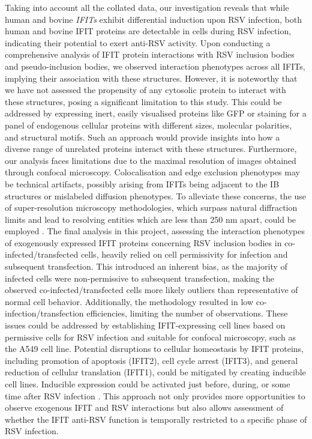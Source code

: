 Taking into account all the collated data, our investigation reveals that while human and bovine \textit{IFITs} exhibit differential induction upon RSV infection, both human and bovine IFIT proteins are detectable in cells during RSV infection, indicating their potential to exert anti-RSV activity. Upon conducting a comprehensive analysis of IFIT protein interactions with RSV inclusion bodies and pseudo-inclusion bodies, we observed interaction phenotypes across all IFITs, implying their association with these structures. However, it is noteworthy that we have not assessed the propensity of any cytosolic protein to interact with these structures, posing a significant limitation to this study. This could be addressed by expressing inert, easily visualised proteins like GFP or staining for a panel of endogenous cellular proteins with different sizes, molecular polarities, and structural motifs. Such an approach would provide insights into how a diverse range of unrelated proteins interact with these structures. Furthermore, our analysis faces limitations due to the maximal resolution of images obtained through confocal microscopy. Colocalisation and edge exclusion phenotypes may be technical artifacts, possibly arising from IFITs being adjacent to the IB structures or mislabeled diffusion phenotypes. To alleviate these concerns, the use of super-resolution microscopy methodologies, which surpass natural diffraction limits and lead to resolving entities which are less than 250 nm apart, could be employed \cite{Schermelleh2019Super-resolutionDemystified}. The final analysis in this project, assessing the interaction phenotypes of exogenously expressed IFIT proteins concerning RSV inclusion bodies in co-infected/transfected cells, heavily relied on cell permissivity for infection and subsequent transfection. This introduced an inherent bias, as the majority of infected cells were non-permissive to subsequent transfection, making the observed co-infected/transfected cells more likely outliers than representative of normal cell behavior. Additionally, the methodology resulted in low co-infection/transfection efficiencies, limiting the number of observations. These issues could be addressed by establishing IFIT-expressing cell lines based on permissive cells for RSV infection and suitable for confocal microscopy, such as the A549 cell line. Potential disruptions to cellular homeostasis by IFIT proteins, including promotion of apoptosis (IFIT2), cell cycle arrest (IFIT3), and general reduction of cellular translation (IFIT1), could be mitigated by creating inducible cell lines. Inducible expression could be activated just before, during, or some time after RSV infection \cite{Kallunki2019HowStudies}. This approach not only provides more opportunities to observe exogenous IFIT and RSV interactions but also allows assessment of whether the IFIT anti-RSV function is temporally restricted to a specific phase of RSV infection.

